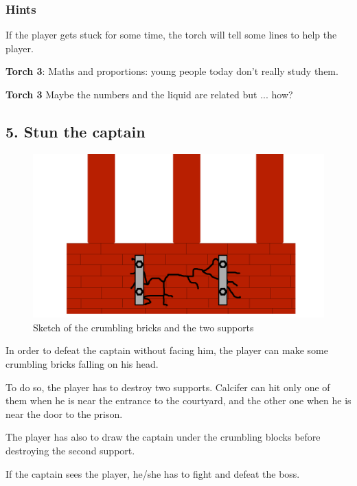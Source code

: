 \subsubsection*{Hints}
If the player gets stuck for some time, the torch will tell some lines to help the player.

\textbf{Torch 3}: Maths and proportions: young people today don't really study them.

\textbf{Torch 3} Maybe the numbers and the liquid are related but ... how? 


\subsection{5. Stun the captain}

\begin{figure}[H]
  \centering
  \includegraphics[width=\textwidth]{Images/Puzzles/castleOfDynamia5}
  \caption{Sketch of the crumbling bricks and the two supports}
\end{figure}

In order to defeat the captain without facing him, the player can make some crumbling bricks falling on his head.

To do so, the player has to destroy two supports. Calcifer can hit only one of them when he is near the entrance to the courtyard, and the other one when he is near the door to the prison.

The player has also to draw the captain under the crumbling blocks before destroying the second support.

If the captain sees the player, he/she has to fight and defeat the boss.

